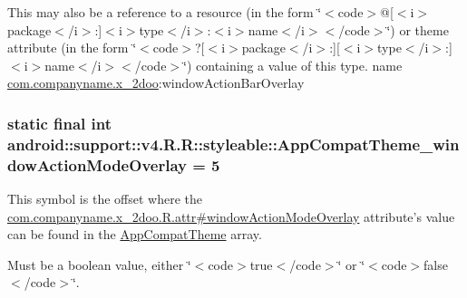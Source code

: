 This may also be a reference to a resource (in the form \char`\"{}$<$code$>$@\mbox{[}$<$i$>$package$<$/i$>$:\mbox{]}$<$i$>$type$<$/i$>$:$<$i$>$name$<$/i$>$$<$/code$>$\char`\"{}) or theme attribute (in the form \char`\"{}$<$code$>$?\mbox{[}$<$i$>$package$<$/i$>$:\mbox{]}\mbox{[}$<$i$>$type$<$/i$>$:\mbox{]}$<$i$>$name$<$/i$>$$<$/code$>$\char`\"{}) containing a value of this type.  name \hyperlink{namespacecom_1_1companyname_1_1x__2doo}{com.companyname.x\_\-2doo}:windowActionBarOverlay \hypertarget{classandroid_1_1support_1_1v4_1_1_r_1_1styleable_1edd340eee109030db65f7a0873156ea}{
\subsubsection[{AppCompatTheme\_\-windowActionModeOverlay}]{\setlength{\rightskip}{0pt plus 5cm}static final int android::support::v4.R.R::styleable::AppCompatTheme\_\-windowActionModeOverlay = 5}}
\label{classandroid_1_1support_1_1v4_1_1_r_1_1styleable_1edd340eee109030db65f7a0873156ea}


This symbol is the offset where the \hyperlink{classcom_1_1companyname_1_1x__2doo_1_1_r_1_1attr_108478131ce031dafd426d3e966086a6}{com.companyname.x\_\-2doo.R.attr\#windowActionModeOverlay} attribute's value can be found in the \hyperlink{classandroid_1_1support_1_1v4_1_1_r_1_1styleable_0873e92ba21076bb5a4aeadeb7f5779f}{AppCompatTheme} array.

Must be a boolean value, either \char`\"{}$<$code$>$true$<$/code$>$\char`\"{} or \char`\"{}$<$code$>$false$<$/code$>$\char`\"{}. 

